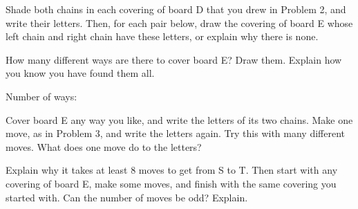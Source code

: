 \documentclass[12pt]{extarticle}
\begin{document}
\vspace{0.2in}
Shade both chains in each covering of board D that you drew in Problem 2, and
write their letters. Then, for each pair below, draw the covering of board E
whose left chain and right chain have these letters, or explain why there is
none.

\vspace{0.3in}

\newpage
{}How many different ways are there to cover board E? Draw them.
Explain how you know you have found them all.

\vspace{0.3in}

\vspace{0.3in}
Number of ways: \underline{\hspace{0.8in}}

\newpage
{}Cover board E any way you like, and write the letters of its two
chains. Make one move, as in Problem 3, and write the letters again. Try this
with many different moves. What does one move do to the letters?


\vspace{0.4in}
Explain why it takes at least 8 moves to get from S to T. Then start
with any covering of board E, make some moves, and finish with the same covering
you started with. Can the number of moves be odd? Explain.

\end{document}
